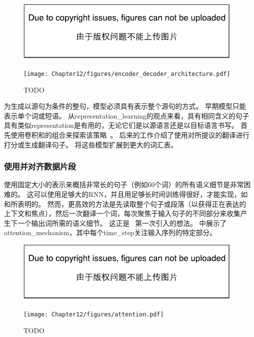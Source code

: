 
\begin{figure}[htp]
\ifOpenSource
\centerline{\includegraphics{figure.pdf}}
\else
\centerline{\texttt{[image: Chapter12/figures/encoder\_decoder\_architecture.pdf]}}
\fi
\caption{TODO}
\label{fig:chap12_encoder_decoder_architecture}
\end{figure}

为生成以源句为条件的整句，模型必须具有表示整个源句的方式。 
早期模型只能表示单个词或短语。
从\gls{representation_learning}的观点来看，具有相同含义的句子具有类似\gls{representation}是有用的，无论它们是以源语言还是以目标语言书写。
首先使用卷积和的组合来探索该策略~\citep{Kalchbrenner+Blunsom-EMNLP2013}。
后来的工作介绍了使用对所提议的翻译进行打分\citep{Cho-et-al-EMNLP2014}或生成翻译句子\citep{Sutskever-et-al-NIPS2014}。
\cite{Jean-et-al-arxiv2014} 将这些模型扩展到更大的词汇表。


\subsubsection{使用并对齐数据片段}
\label{sec:using_an_attention_mechanism_and_aligning_pieces_of_data}
 使用固定大小的表示来概括非常长的句子（例如60个词）的所有语义细节是非常困难的。 
 这可以使用足够大的RNN，并且用足够长时间训练得很好，才能实现，如 \citet{Cho-et-al-EMNLP2014}和\citet{Sutskever-et-al-NIPS2014}所表明的。
 然而，更高效的方法是先读取整个句子或段落（以获得正在表达的上下文和焦点），然后一次翻译一个词，每次聚焦于输入句子的不同部分来收集产生下一个输出词所需的语义细节。
 这正是~\citet{Bahdanau-et-al-ICLR2015-small} 第一次引入的想法。
 中展示了\gls{attention_mechanism}，其中每个\gls{time_step}关注输入序列的特定部分。

 \begin{figure}[htp]
\ifOpenSource
\centerline{\includegraphics{figure.pdf}}
\else
\centerline{\texttt{[image: Chapter12/figures/attention.pdf]}}
\fi
\caption{TODO}
\label{fig:chap12_attention}
\end{figure}

